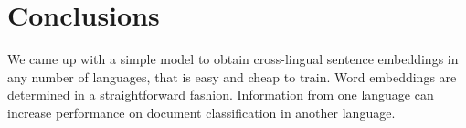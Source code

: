 \documentclass[a4paper,11pt]{article}
\begin{document}




\section*{Conclusions}


We came up with a simple model to obtain cross-lingual sentence embeddings in any number of languages, that is easy and cheap to train. Word embeddings are determined in a straightforward fashion. Information from one language can increase performance on document classification in another language. 













\end{document}
